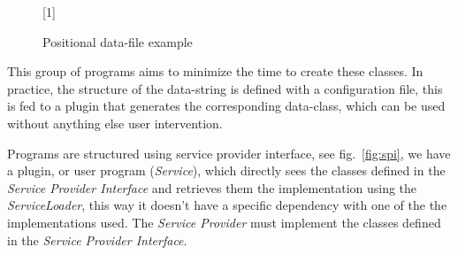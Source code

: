 \begin{figure}[!htb]
\scalebox{0.7}[1]{
\texttt{%
\fbox[lb]{ }%
\fbox[lb]{ }%
\fbox[lb]{ }%
\fbox[lb]{ }%
\fbox[lb]{ }%
\fbox[lb]{ }%
\fbox[lb]{ }%
\fbox[lb]{ }%
\fbox[lb]{ }%
\fbox[lb]{ }%
\fbox[lb]{ }%
\fbox[lb]{ }%
\fbox[lb]{ }%
\fbox[lb]{ }%
\fbox[lb]{ }%
\fbox[lb]{ }%
\fbox[lb]{ }%
\fbox[lb]{ }%
\fbox[lb]{ }%
\fbox[lb]{ }%
\fbox[lb]{ }%
\fbox[lb]{ }%
\fbox[lb]{ }%
\fbox[lb]{ }%
\fbox[lb]{ }%
\fbox[lb]{ }%
\fbox[lb]{ }%
\fbox[lb]{ }%
}}

\caption{Positional data-file example} 
\label{fig:str.data}
\end{figure}



This group of programs aims to minimize the time to create these classes. 
In practice, the structure of the data-string is defined with a configuration 
file, this is fed to a plugin that generates the corresponding data-class, 
which can be used without anything else user intervention.

Programs are structured using service provider interface, see 
fig.~\ref{fig:spi}, we have a plugin, or user program (\textsl{Service}), which 
directly sees the classes defined in the \textsl{Service Provider Interface} and 
retrieves them the implementation using the \textsl{ServiceLoader}, this way it 
doesn't have a specific dependency with one of the the implementations used. 
The \textsl{Service Provider} must implement the classes defined in the 
\textsl{Service Provider Interface}.

